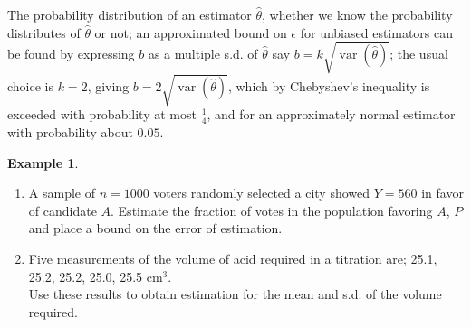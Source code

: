 \documentclass[11pt,a4paper]{article}
\theoremstyle{definition}
\newtheorem{example}[thm]{Example}
\begin{document}
The probability distribution of an estimator $\hat{\theta}$, whether we know the probability distributes of $\hat{\theta}$ or not; an approximated bound on $\epsilon$ for unbiased estimators can be found by expressing $b$ as a multiple s.d. of $\hat{\theta}$ say $b=k\sqrt{\operatorname{var}(\hat{\theta})}$; the usual choice is $k=2$, giving $b=2\sqrt{\operatorname{var}(\hat{\theta})}$, which by Chebyshev's inequality is exceeded with probability at most $\frac14$, and for an approximately normal estimator with probability about $0.05$.\\








\begin{example}
\begin{enumerate}
\item A sample of $n=1000$ voters randomly selected a city showed $Y=560$ in favor of candidate $A$. Estimate the fraction of votes in the population favoring $A$, $P$ and place a bound on the error of estimation.
\item Five measurements of the volume of acid required in a titration are; 25.1, 25.2, 25.2, 25.0, 25.5 cm$^3$.\\ Use these results to obtain estimation for the mean and s.d. of the volume required.\\
\end{enumerate} 
\end{example}
\end{document}
